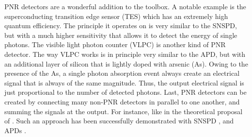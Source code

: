 \documentclass[times,final]{elsarticle}
\newcommand{\sihui}[1]{{\color{Orchid}{#1}}}
\begin{document}
PNR detectors are a wonderful addition to the \sihui{linear optical} toolbox. A notable example is the superconducting transition edge sensor (TES) which has an extremely high quantum efficiency. The principle it operates on is very similar to the SNSPD, but with a much higher sensitivity that allows it to detect the energy of single photons.
The visible light photon counter (VLPC) is another kind of PNR detector. The way VLPC works is in principle very similar to the APD, but with an additional layer of silicon that is lightly doped with arsenic (As). Owing to the presence of the As, a single photon absorption event always create an electrical signal that is always of the same magnitude. Thus, the output electrical signal is just proportional to the number of detected photons.
Last, PNR detectors can be created by connecting many non-PNR detectors in parallel to one another, and summing the signals at the output. For instance, like in the theoretical proposal of \cite{bib:Sperling12}. Such an approach has been successfully demonstrated with SNSPD \cite{bib:Divochiy08}, and APDs \cite{bib:Kalashnikov12,bib:Chrapkiewicz14,bib:Heilmanndc15}. 



\end{document}
